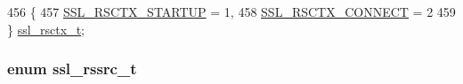 \begin{DoxyCode}
456              \{
457     \hyperlink{group__MOD__SSL__PRIVATE_gga368ff85eb593119b57fd6f64fad13947a981c4628f08adb43a8937559cdab7ce5}{SSL\_RSCTX\_STARTUP} = 1,
458     \hyperlink{group__MOD__SSL__PRIVATE_gga368ff85eb593119b57fd6f64fad13947a8157a7ccb6bdd464a5655b53dd4c7129}{SSL\_RSCTX\_CONNECT} = 2
459 \} \hyperlink{group__MOD__SSL__PRIVATE_ga368ff85eb593119b57fd6f64fad13947}{ssl\_rsctx\_t};
\end{DoxyCode}
\subsubsection[{\texorpdfstring{ssl\+\_\+rssrc\+\_\+t}{ssl_rssrc_t}}]{\setlength{\rightskip}{0pt plus 5cm}enum {\bf ssl\+\_\+rssrc\+\_\+t}}\hypertarget{group__MOD__SSL__PRIVATE_ga950679a8e8bb92658a71bcfdb304390f}{}\label{group__MOD__SSL__PRIVATE_ga950679a8e8bb92658a71bcfdb304390f}

